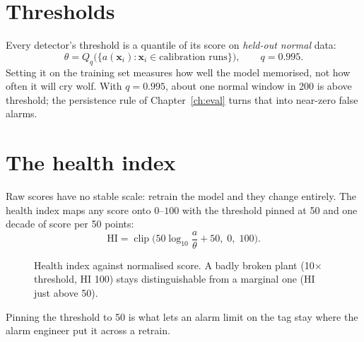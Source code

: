 \section{Thresholds}

Every detector's threshold is a quantile of its score on \emph{held-out
normal} data:
\begin{equation}
  \theta = Q_{q}\big(\{a(\bm x_i) : \bm x_i \in \text{calibration runs}\}\big),
  \qquad q = 0.995 .
\end{equation}
Setting it on the training set measures how well the model memorised, not
how often it will cry wolf. With $q=0.995$, about one normal window in 200
is above threshold; the persistence rule of Chapter~\ref{ch:eval} turns that
into near-zero false alarms.

\section{The health index}

Raw scores have no stable scale: retrain the model and they change entirely.
The health index maps any score onto $0$--$100$ with the threshold pinned at
50 and one decade of score per 50 points:
\begin{equation}
  \text{HI} = \operatorname{clip}\!\Big(50\log_{10}\frac{a}{\theta} + 50,\;0,\;100\Big).
\end{equation}

\begin{figure}[htbp]
\centering
{}
\caption{Health index against normalised score. A badly broken plant
(10$\times$ threshold, HI 100) stays distinguishable from a marginal one
(HI just above 50).}
\label{fig:health}
\end{figure}

Pinning the threshold to 50 is what lets an alarm limit on the
 tag stay where the alarm engineer put it across a retrain.

